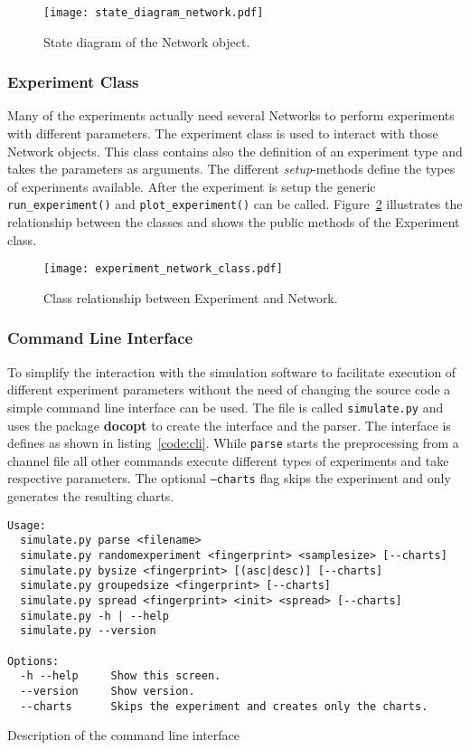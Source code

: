\documentclass[final]{fhnwreport}       %
\begin{document}
\begin{figure}[H]
\centering
\texttt{[image: state\_diagram\_network.pdf]}
\caption{State diagram of the Network object.}
\label{fig:state_network}
\end{figure}

\subsubsection{Experiment Class}
Many of the experiments actually need several Networks to perform experiments with different parameters. The experiment class is used to interact with those Network objects. This class contains also the definition of an experiment type and takes the parameters as arguments. The different \textit{setup}-methods define the types of experiments available. After the experiment is setup the generic \texttt{run_experiment()} and \texttt{plot_experiment()} can be called. Figure~\ref{fig:experiment_class} illustrates the relationship between the classes and shows the public methods of the Experiment class.

\begin{figure}[H]
\centering
\texttt{[image: experiment\_network\_class.pdf]}
\caption{Class relationship between Experiment and Network.}
\label{fig:experiment_class}
\end{figure}

\subsubsection{Command Line Interface}
To simplify the interaction with the simulation software to facilitate execution of different experiment parameters without the need of changing the source code a simple command line interface can be used. The file is called \texttt{simulate.py} and uses the package \textbf{docopt} to create the interface and the parser. The interface is defines as shown in listing~\ref{code:cli}. While \texttt{parse} starts the preprocessing from a channel file all other commands execute different types of experiments and take respective parameters. The optional \texttt{---charts} flag skips the experiment and only generates the resulting charts.

\begin{listing}[H]
  \begin{verbatim}
Usage:
  simulate.py parse <filename>
  simulate.py randomexperiment <fingerprint> <samplesize> [--charts]
  simulate.py bysize <fingerprint> [(asc|desc)] [--charts]
  simulate.py groupedsize <fingerprint> [--charts]
  simulate.py spread <fingerprint> <init> <spread> [--charts]
  simulate.py -h | --help
  simulate.py --version

Options:
  -h --help     Show this screen.
  --version     Show version.
  --charts      Skips the experiment and creates only the charts.

\end{verbatim}
\caption{Description of the command line interface}
\label{code:cli}
\end{listing}
\end{document}
